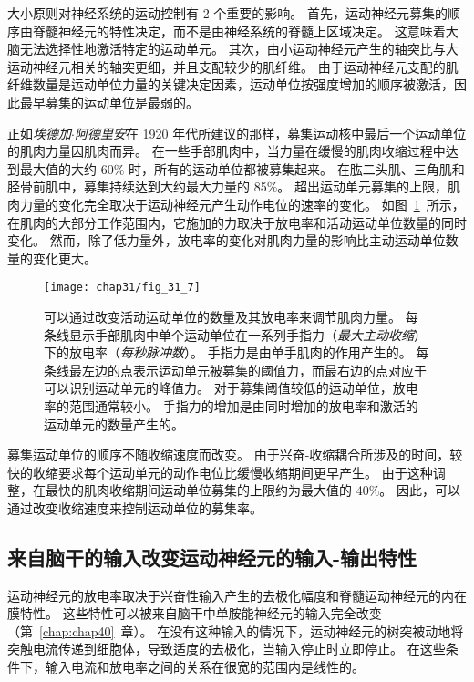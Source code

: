 大小原则对神经系统的运动控制有 2 个重要的影响。
首先，运动神经元募集的顺序由脊髓神经元的特性决定，而不是由神经系统的脊髓上区域决定。
这意味着大脑无法选择性地激活特定的运动单元。
其次，由小运动神经元产生的轴突比与大运动神经元相关的轴突更细，并且支配较少的肌纤维。
由于运动神经元支配的肌纤维数量是运动单位力量的关键决定因素，运动单位按强度增加的顺序被激活，因此最早募集的运动单位是最弱的。


正如\textit{埃德加$\cdot$阿德里安}在 1920 年代所建议的那样，募集运动核中最后一个运动单位的肌肉力量因肌肉而异。
在一些手部肌肉中，当力量在缓慢的肌肉收缩过程中达到最大值的大约 60\% 时，所有的运动单位都被募集起来。
在肱二头肌、三角肌和胫骨前肌中，募集持续达到大约最大力量的 85\%。
超出运动单元募集的上限，肌肉力量的变化完全取决于运动神经元产生动作电位的速率的变化。
如图~\ref{fig:31_7}~所示，在肌肉的大部分工作范围内，它施加的力取决于放电率和活动运动单位数量的同时变化。
然而，除了低力量外，放电率的变化对肌肉力量的影响比主动运动单位数量的变化更大。


\begin{figure}[htbp]
	\centering
	\texttt{[image: chap31/fig\_31\_7]}
	\caption{可以通过改变活动运动单位的数量及其放电率来调节肌肉力量。
	每条线显示手部肌肉中单个运动单位在一系列手指力（\textit{最大主动收缩}）下的放电率（\textit{每秒脉冲数}）。
	手指力是由单手肌肉的作用产生的。
	每条线最左边的点表示运动单元被募集的阈值力，而最右边的点对应于可以识别运动单元的峰值力。
	对于募集阈值较低的运动单位，放电率的范围通常较小。
	手指力的增加是由同时增加的放电率和激活的运动单元的数量产生的\cite{moritz2005discharge}。}
	\label{fig:31_7}
\end{figure}


募集运动单位的顺序不随收缩速度而改变。
由于兴奋-收缩耦合所涉及的时间，较快的收缩要求每个运动单元的动作电位比缓慢收缩期间更早产生。
由于这种调整，在最快的肌肉收缩期间运动单位募集的上限约为最大值的 40\%。
因此，可以通过改变收缩速度来控制运动单位的募集率。



\subsection{来自脑干的输入改变运动神经元的输入-输出特性}

运动神经元的放电率取决于兴奋性输入产生的去极化幅度和脊髓运动神经元的内在膜特性。
这些特性可以被来自脑干中单胺能神经元的输入完全改变（第~\ref{chap:chap40}~章）。
在没有这种输入的情况下，运动神经元的树突被动地将突触电流传递到细胞体，导致适度的去极化，当输入停止时立即停止。
在这些条件下，输入电流和放电率之间的关系在很宽的范围内是线性的。


